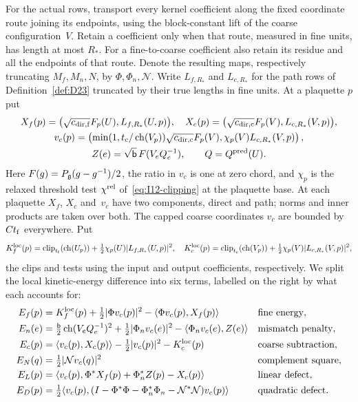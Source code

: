 For the actual rows, transport every kernel coefficient along the fixed coordinate route joining its endpoints, using the block-constant lift of the coarse configuration~$V$. Retain a coefficient only when that route, measured in fine units, has length at most $R_*$. For a fine-to-coarse coefficient also retain its residue and all the endpoints of that route. Denote the resulting maps, respectively truncating $M_f,M_n,N$, by $\Phi,\Phi_n,\mathcal N$. Write $L_{f,R_*}$ and $L_{c,R_*}$ for the path rows of Definition~\ref{def:D23} truncated by their true lengths in fine units. At a plaquette $p$ put
\begin{gather*}
X_f(p)=\bigl(\sqrt{c_{{\rm dir},{\rm f}}}F_p(U),L_{f,R_*}(U,p)\bigr),\quad
X_c(p)=\bigl(\sqrt{c_{{\rm dir},{\rm c}}}F_p(V),L_{c,R_*}(V,p)\bigr),\\
v_c(p)=\left(\min(1,t_{\rm c}/\operatorname{ch}(V_p))\sqrt{c_{{\rm dir},{\rm c}}}F_p(V),
\chi_p(V)L_{c,R_*}(V,p)\right),\\
Z(e)=\sqrt{\mathsf{b}}\,F(V_eQ_e^{-1}),\qquad Q=Q^{\rm pred}(U).
\end{gather*}
Here $F(g)=P_{\mathfrak{g}}(g-g^{-1})/2$, the ratio in $v_c$ is one at zero chord, and $\chi_p$ is the relaxed threshold test $\chi^{\rm rel}$ of~\eqref{eq:I12-clipping} at the plaquette base. At each plaquette $X_f$, $X_c$ and~$v_c$ have two components, direct and path; norms and inner products are taken over both. The capped coarse coordinates $v_c$ are bounded by $Ct_{\rm f}$ everywhere. Put
\begin{equation*}
K^{\rm loc}_f(p)=\operatorname{clip}_{t_{\rm f}}(\operatorname{ch}(U_p))+\tfrac12\chi_p(U)|L_{f,R_*}(U,p)|^2,
\quad K^{\rm loc}_c(p)=\operatorname{clip}_{t_{\rm c}}(\operatorname{ch}(V_p))+\tfrac12\chi_p(V)|L_{c,R_*}(V,p)|^2,
\end{equation*}
the clips and tests using the input and output coefficients, respectively. We split the local kinetic-energy difference into six terms, labelled on the right by what each accounts for:
\begin{align*}
E_f(p)&=K^{\rm loc}_f(p)+\tfrac12|\Phi v_c(p)|^2-\langle\Phi v_c(p),X_f(p)\rangle
 &&\text{fine energy},\\
E_n(e)&=\tfrac{\mathsf{b}}2\operatorname{ch}(V_eQ_e^{-1})^2
 +\tfrac12|\Phi_nv_c(e)|^2-\langle\Phi_nv_c(e),Z(e)\rangle
 &&\text{mismatch penalty},\\
E_c(p)&=\langle v_c(p),X_c(p)\rangle-\tfrac12|v_c(p)|^2-K^{\rm loc}_c(p)
 &&\text{coarse subtraction},\\
E_N(q)&=\tfrac12|\mathcal Nv_c(q)|^2
 &&\text{complement square},\\
E_L(p)&=\langle v_c(p),\Phi^*X_f(p)+\Phi_n^*Z(p)-X_c(p)\rangle
 &&\text{linear defect},\\
E_D(p)&=\tfrac12\langle v_c(p),(I-\Phi^*\Phi-\Phi_n^*\Phi_n-\mathcal N^*\mathcal N)v_c(p)\rangle
 &&\text{quadratic defect}.
\end{align*}
